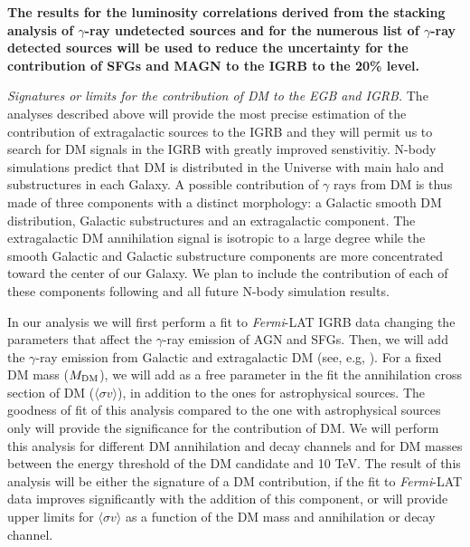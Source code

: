 \documentclass[12 pt]{article}
\begin{document}
{\bf The results for the luminosity correlations derived from the stacking analysis of $\gamma$-ray undetected sources and for the numerous list of $\gamma$-ray detected sources will be used to reduce the uncertainty for the contribution of SFGs and MAGN to the IGRB to the 20\% level.}



{\it Signatures or limits for the contribution of DM to the EGB and IGRB.}
The analyses described above will provide the most precise estimation of the contribution of extragalactic sources to the IGRB and they will permit us to search for DM signals in the IGRB with greatly improved senstivitiy. 
N-body simulations predict that DM is distributed in the Universe with main halo and substructures in each Galaxy.
A possible contribution of $\gamma$ rays from DM is thus made of three components with a distinct morphology: a Galactic smooth DM distribution, Galactic substructures and an extragalactic component.
The extragalactic DM annihilation signal is isotropic to a large degree while the smooth Galactic and Galactic substructure components are more concentrated toward the center of our Galaxy.
We plan to include the contribution of each of these components following \cite{Cirelli:2010xx,Ajello:2015mfa} and all future N-body simulation results.

In our analysis we will first perform a fit to {\it Fermi}-LAT IGRB data changing the parameters that affect the $\gamma$-ray emission of AGN and SFGs. 
Then, we will add the $\gamma$-ray emission from Galactic and extragalactic DM (see, e.g, \cite{DiMauro:2015tfa,Ajello:2015mfa}). For a fixed DM mass ($M_{\rm{DM}}$), we will add as a free parameter in the fit the annihilation cross section of DM ($\langle \sigma v \rangle$), in addition to the ones for astrophysical sources.
The goodness of fit of this analysis compared to the one with astrophysical sources only will provide the significance for the contribution of DM.
We will perform this analysis for different DM annihilation and decay channels and for DM masses between the energy threshold of the DM candidate and 10 TeV.
The result of this analysis will be either the signature of a DM contribution, if the fit to {\it Fermi}-LAT data improves significantly with the addition of this component, or will provide upper limits for $\langle \sigma v \rangle$ as a function of the DM mass and annihilation or decay channel.
\end{document}
